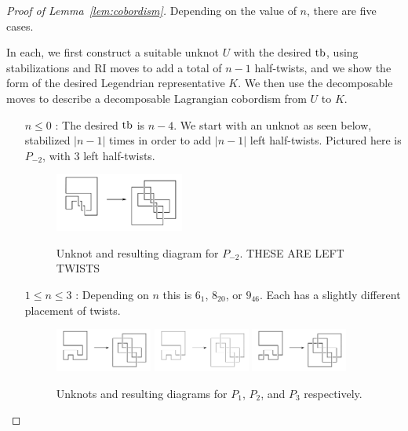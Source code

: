 \begin{proof}[Proof of Lemma~\ref{lem:cobordism}]

    Depending on the value of $n$, there are five cases.

    In each, we first construct a suitable unknot $U$ with the desired $\operatorname{tb}$, using stabilizations and RI moves to add a total of $n-1$ half-twists, and we show the form of the desired Legendrian representative $K$. We then use the decomposable moves to describe a decomposable Lagrangian cobordism from $U$ to $K$. 

\begin{itemize}

    \item[$n \leq 0$ :]
        The desired $\operatorname{tb}$ is $n-4$. We start with an unknot as seen below, stabilized $|n - 1|$ times in order to add $|n - 1|$ left half-twists. Pictured here is $P_{-2}$, with 3 left half-twists.
        \begin{figure}[h!]
            \centering
            \includegraphics[width=0.4\textwidth]{images/pretzel--2-construction.pdf}
            \label{fig:pretzel-2}
            \caption{Unknot and resulting diagram for $P_{-2}$. THESE ARE LEFT TWISTS}
        \end{figure}

    \item[$1 \leq n \leq 3$ :]
        Depending on $n$ this is $6_1$, $8_{20}$, or $9_{46}$. Each has a slightly different placement of twists.
        \begin{figure}[ht!]
            \centering
            \includegraphics[width=0.3\textwidth]{images/pretzel-+1-construction.pdf} \hfill
            \includegraphics[width=0.3\textwidth]{images/pretzel-+2-construction.pdf} \hfill
            \includegraphics[width=0.3\textwidth]{images/pretzel-+3-construction.pdf}
            \label{fig:pretzel-singles}
            \caption{Unknots and resulting diagrams for $P_1$, $P_2$, and $P_3$ respectively.}
        \end{figure}


\end{itemize}
\end{proof}
